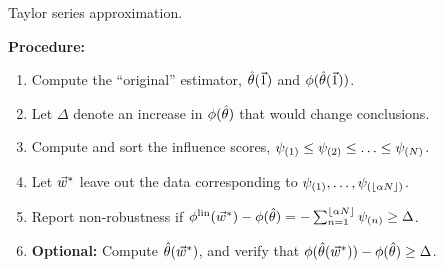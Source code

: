 \begin{frame}{Taylor series approximation.}

\textbf{Procedure:}

\begin{enumerate}
    \item<2-> Compute the ``original'' estimator, $\hat{\theta}(\vec{1})$ and
    $\phi(\hat{\theta}(\vec{1}))$.
    \item<3-> Let $\Delta$ denote an increase in $\phi(\hat{\theta})$
    that would change conclusions.
    \item<4-> Compute and sort the influence scores,
        $\psi_{(1)} \le \psi_{(2)} \le \ldots \le \psi_{(N)}$.
    \item<5-> Let $\vec{w}^*$ leave out the data corresponding to
    $\psi_{(1)},  \ldots , \psi_{(\lfloor \alpha N \rfloor)}$.
    \item<6-> Report non-robustness if
        $ \phi^{\mathrm{lin}}(\vec{w}^*) - \phi(\hat{\theta})  =
            - \sum_{n=1}^{\lfloor \alpha N \rfloor} \psi_{(n)} \ge \Delta$.
    \item<7-> \textbf{Optional: } Compute $\hat{\theta}(\vec{w}^*)$, and verify
    that $\phi(\hat{\theta}(\vec{w}^*)) - \phi(\hat{\theta}) \ge \Delta$.
\end{enumerate}

\end{frame}
